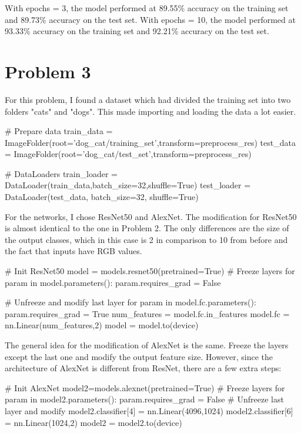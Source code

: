\documentclass{article}
\numberwithin{equation}{section}
\numberwithin{equation}{section}
\begin{document}
With epochs = 3, the model performed at 89.55\% accuracy on the training set and 89.73\% accuracy on the test set. With epochs = 10, the model performed at 93.33\% accuracy on the training set and 92.21\% accuracy on the test set. 

\section{Problem 3}
For this problem, I found a dataset which had divided the training set into two folders "cats" and "dogs". This made importing and loading the data a lot easier.

\begin{python}
# Prepare data
train_data = ImageFolder(root='dog_cat/training_set',transform=preprocess_res)
test_data = ImageFolder(root='dog_cat/test_set',transform=preprocess_res)

# DataLoaders
train_loader = DataLoader(train_data,batch_size=32,shuffle=True)
test_loader = DataLoader(test_data, batch_size=32, shuffle=True)

\end{python}

For the networks, I chose ResNet50 and AlexNet. The modification for ResNet50 is almost identical to the one in Problem 2. The only differences are the size of the output classes, which in this case is 2 in comparison to 10 from before and the fact that inputs have RGB values.

\begin{python}
# Init ResNet50
model = models.resnet50(pretrained=True)
# Freeze layers
for param in model.parameters():
    param.requires_grad = False

# Unfreeze and modify last layer
for param in model.fc.parameters():
    param.requires_grad = True
num_features = model.fc.in_features
model.fc = nn.Linear(num_features,2)
model = model.to(device)

\end{python}

The general idea for the modification of AlexNet is the same. Freeze the layers except the last one and modify the output feature size. However, since the architecture of AlexNet is different from ResNet, there are a few extra steps:
\begin{python}
# Init AlexNet
model2=models.alexnet(pretrained=True)
# Freeze layers
for param in model2.parameters():
    param.requires_grad = False
# Unfreeze last layer and modify
model2.classifier[4] = nn.Linear(4096,1024)
model2.classifier[6] = nn.Linear(1024,2)
model2 = model2.to(device) 
\end{python}
\end{document}
